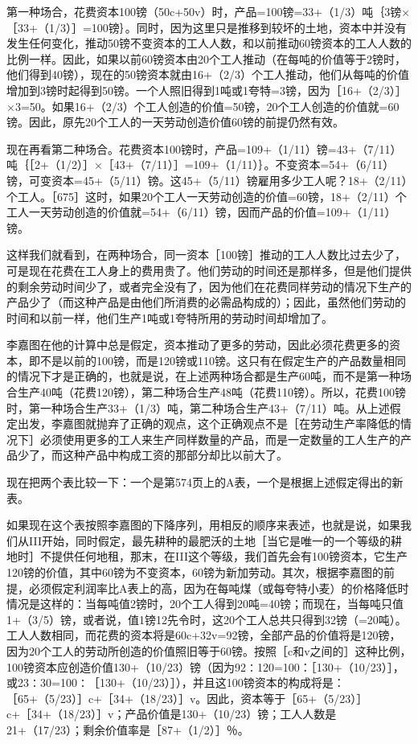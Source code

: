 第一种场合，花费资本100镑（50c+50v）时，产品=100镑=33+（1/3）吨｛3镑×［33+（1/3）］=100镑｝。同时，因为这里只是推移到较坏的土地，资本中并没有发生任何变化，推动50镑不变资本的工人人数，和以前推动60镑资本的工人人数的比例一样。因此，如果以前60镑资本由20个工人推动（在每吨的价值等于2镑时，他们得到40镑），现在的50镑资本就由16+（2/3）个工人推动，他们从每吨的价值增加到3镑时起得到50镑。一个人照旧得到1吨或1夸特=3镑，因为［16+（2/3）］×3=50。如果16+（2/3）个工人创造的价值=50镑，20个工人创造的价值就=60镑。因此，原先20个工人的一天劳动创造价值60镑的前提仍然有效。

现在再看第二种场合。花费资本100镑时，产品=109+（1/11）镑=43+（7/11）吨｛［2+（1/2）］×［43+（7/11）］=109+（1/11）｝。不变资本=54+（6/11）镑，可变资本=45+（5/11）镑。这45+（5/11）镑雇用多少工人呢？18+（2/11）个工人。［675］这时，如果20个工人一天劳动创造的价值=60镑，18+（2/11）个工人一天劳动创造的价值就=54+（6/11）镑，因而产品的价值=109+（1/11）镑。

这样我们就看到，在两种场合，同一资本［100镑］推动的工人人数比过去少了，可是现在花费在工人身上的费用贵了。他们劳动的时间还是那样多，但是他们提供的剩余劳动时间少了，或者完全没有了，因为他们在花费同样劳动的情况下生产的产品少了（而这种产品是由他们所消费的必需品构成的）；因此，虽然他们劳动的时间和以前一样，他们生产1吨或1夸特所用的劳动时间却增加了。

李嘉图在他的计算中总是假定，资本推动了更多的劳动，因此必须花费更多的资本，即不是以前的100镑，而是120镑或110镑。这只有在假定生产的产品数量相同的情况下才是正确的，也就是说，在上述两种场合都是生产60吨，而不是第一种场合生产40吨（花费120镑），第二种场合生产48吨（花费110镑）。所以，花费100镑时，第一种场合生产33+（1/3）吨，第二种场合生产43+（7/11）吨。从上述假定出发，李嘉图就抛弃了正确的观点，这个正确观点不是［在劳动生产率降低的情况下］必须使用更多的工人来生产同样数量的产品，而是一定数量的工人生产的产品少了，而这种产品中构成工资的那部分却比以前大了。

现在把两个表比较一下：一个是第574页上的A表，一个是根据上述假定得出的新表。

\todo{}

如果现在这个表按照李嘉图的下降序列，用相反的顺序来表述，也就是说，如果我们从III开始，同时假定，最先耕种的最肥沃的土地［当它是唯一的一个等级的耕地时］不提供任何地租，那末，在III这个等级，我们首先会有100镑资本，它生产120镑的价值，其中60镑为不变资本，60镑为新加劳动。其次，根据李嘉图的前提，必须假定利润率比A表上的高，因为在每吨煤（或每夸特小麦）的价格降低时情况是这样的：当每吨值2镑时，20个工人得到20吨=40镑；而现在，当每吨只值1+（3/5）镑，或者说，值1镑12先令时，这20个工人总共只得到32镑（=20吨）。工人人数相同，而花费的资本将是60c+32v=92镑，全部产品的价值将是120镑，因为20个工人的劳动所创造的价值照旧等于60镑。按照［c和v之间的］这种比例，100镑资本应创造价值130+（10/23）镑（因为92∶120=100：［130+（10/23）］，或23∶30=100∶［130+（10/23）］），并且这100镑资本的构成将是：［65+（5/23）］c+［34+（18/23）］v。因此，资本等于［65+（5/23）］c+［34+（18/23）］v；产品价值是130+（10/23）镑；工人人数是21+（17/23）；剩余价值率是［87+（1/2）］％。

